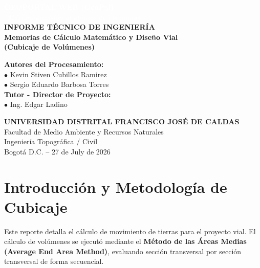 \documentclass[11pt,letterpaper]{article}
\begin{document}
\begin{titlepage}
\vspace*{-2cm}
\begin{center}
  \textcolor{white}{\Huge \textbf{GEOPORTAL WEB (GeoPol)}} \\[0.5cm]
  \textcolor{white}{\large \textit{''Máxima precisión al alcance de tus manos''}} \\[2cm]
  \vspace{3cm}
  {\LARGE \textbf{INFORME TÉCNICO DE INGENIERÍA}} \\[0.5cm]
  {\Large \textbf{Memorias de Cálculo Matemático y Diseño Vial\\ (Cubicaje de Volúmenes)}} \\[2cm]
  \begin{flushleft}
    \Large \textbf{Autores del Procesamiento:}\\[0.2cm]
    \large $\bullet$ Kevin Stiven Cubillos Ramirez \\[0.1cm]
    \large $\bullet$ Sergio Eduardo Barbosa Torres \\[0.1cm]
    \vspace{1cm}
    \Large \textbf{Tutor - Director de Proyecto:}\\[0.2cm]
    \large $\bullet$ Ing. Edgar Ladino
  \end{flushleft}
  \vfill
  \textbf{UNIVERSIDAD DISTRITAL FRANCISCO JOSÉ DE CALDAS}\\[0.2cm]
  Facultad de Medio Ambiente y Recursos Naturales \\ Ingeniería Topográfica / Civil \\[0.2cm]
  Bogotá D.C. -- 27 de July de 2026
\end{center}
\end{titlepage}
\tableofcontents
\newpage
\section{Introducción y Metodología de Cubicaje}
Este reporte detalla el cálculo de movimiento de tierras para el proyecto vial. El cálculo de volúmenes se ejecutó mediante el \textbf{Método de las Áreas Medias (Average End Area Method)}, evaluando sección transversal por sección transversal de forma secuencial.
\end{document}
